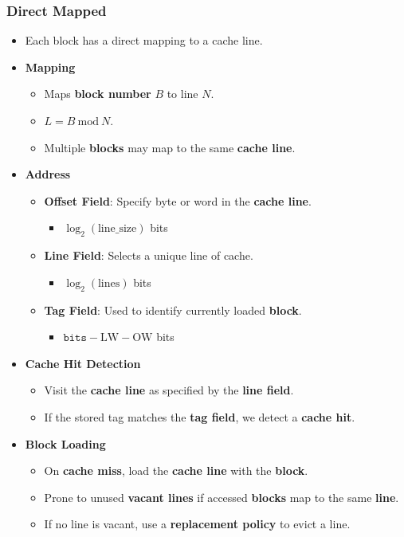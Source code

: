 \documentclass[12pt, letterpaper]{article}
\begin{document}
\subsubsection*{Direct Mapped}

\begin{itemize}
  \item Each block has a direct mapping to a cache line.
  \item \textbf{Mapping}
    \begin{itemize}
      \item Maps \textbf{block number} $ B $ to line $ N $.
      \item $ L = B \: \textrm{mod} \: N $.
      \item Multiple \textbf{blocks} may map to the same
        \textbf{cache line}.
    \end{itemize}
  \item \textbf{Address}
    \begin{itemize}
      \item \textbf{Offset Field}: Specify byte or word in the
        \textbf{cache line}.
        \begin{itemize}
          \item $ \log_2 (\textrm{line\_size}) $ bits
        \end{itemize}
      \item \textbf{Line Field}: Selects a unique line of cache.
        \begin{itemize}
          \item $ \log_2(\textrm{lines}) $ bits
        \end{itemize}
      \item \textbf{Tag Field}: Used to identify currently loaded
        \textbf{block}.
        \begin{itemize}
          \item $ \texttt{bits} - \textrm{LW} - \textrm{OW} $ bits
        \end{itemize}
    \end{itemize}
  \item \textbf{Cache Hit Detection}
    \begin{itemize}
      \item Visit the \textbf{cache line} as specified by the
        \textbf{line field}.
      \item If the stored tag matches the \textbf{tag field}, we
        detect a \textbf{cache hit}.
    \end{itemize}
  \item \textbf{Block Loading}
    \begin{itemize}
      \item On \textbf{cache miss}, load the \textbf{cache line} with
        the \textbf{block}.
      \item Prone to unused \textbf{vacant lines} if accessed
        \textbf{blocks} map to the same \textbf{line}.
      \item If no line is vacant, use a \textbf{replacement policy}
        to evict a line.
    \end{itemize}
\end{itemize}
\end{document}
